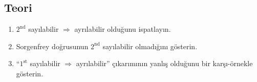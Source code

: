 \subsection*{Teori}

\begin{enumerate}[label=T\arabic*.]
\item $2^{\text{nd}}$ sayılabilir $\Rightarrow$ ayrılabilir olduğunu ispatlayın.
\item Sorgenfrey doğrusunun $2^{\text{nd}}$ sayılabilir olmadığını gösterin.
\item ``$1^{\text{st}}$ sayılabilir $\Rightarrow$ ayrılabilir'' çıkarımının yanlış
      olduğunu bir karşı-örnekle gösterin.
\end{enumerate}
